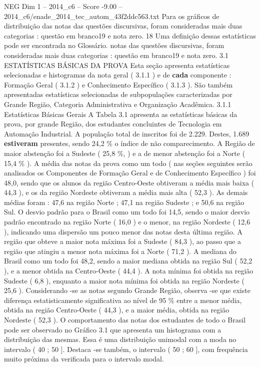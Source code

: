\begin{textsample}{NEG Dim 1 – 2014\_c6 – Score -9.00 – 2014\_c6/enade\_2014\_tec\_autom\_43f2ddc563.txt}
Para os gráficos de distribuição das notas das questões discursivas, foram consideradas mais duas categorias : questão em branco19 e nota zero. 18 Uma definição dessas estatísticas pode ser encontrada no Glossário. notas das questões discursivas, foram consideradas mais duas categorias : questão em branco19 e nota zero. 3.1 ESTATÍSTICAS BÁSICAS DA PROVA Esta seção apresenta estatísticas selecionadas e histogramas da nota geral ( 3.1.1 ) e de \textbf{cada} componente : Formação Geral ( 3.1.2 ) e Conhecimento Específico ( 3.1.3 ).
São também apresentadas estatísticas selecionadas de subpopulações caracterizadas por Grande Região, Categoria Administrativa e Organização Acadêmica. 3.1.1 Estatísticas Básicas Gerais A Tabela 3.1 apresenta as estatísticas básicas da prova, por grande Região, dos estudantes concluintes de Tecnologia em Automação Industrial.
A população total de inscritos foi de 2.229.
Destes, 1.689 \textbf{estiveram} presentes, sendo 24,2 \% o índice de não comparecimento.
A Região de maior abstenção foi a Sudeste ( 25,8 \%, ) e a de menor abstenção foi a Norte ( 15,4 \% ).
A média das notas da prova como um todo ( nas seções seguintes serão analisados os Componentes de Formação Geral e de Conhecimento Específico ) foi 48,0, sendo que os alunos da região Centro-Oeste obtiveram a média mais baixa ( 44,3 ), e os da região Nordeste obtiveram a média mais alta ( 52,3 ).
As demais médias foram : 47,6 na região Norte ; 47,1 na região Sudeste ; e 50,6 na região Sul.
O desvio padrão para o Brasil como um todo foi 14,5, sendo o maior desvio padrão encontrado na região Norte ( 16,0 ) e o menor, na região Nordeste ( 12,6 ), indicando uma dispersão um pouco menor das notas desta última região.
A região que obteve a maior nota máxima foi a Sudeste ( 84,3 ), ao passo que a região que atingiu a menor nota máxima foi a Norte ( 71,2 ).
A mediana do Brasil como um todo foi 48,2, sendo a maior mediana obtida na região Sul ( 52,2 ), e a menor obtida na Centro-Oeste ( 44,4 ).
A nota mínima foi obtida na região Sudeste ( 6,8 ), enquanto a maior nota mínima foi obtida na região Nordeste ( 25,6 ).
Considerando -se as notas segundo Grande Região, observa -se que existe diferença estatisticamente significativa ao nível de 95 \% entre a menor média, obtida na região Centro-Oeste ( 44,3 ), e a maior média, obtida na região Nordeste ( 52,3 ).
O comportamento das notas dos estudantes de todo o Brasil pode ser observado no Gráfico 3.1 que apresenta um histograma com a distribuição das mesmas.
Essa é uma distribuição unimodal com a moda no intervalo ( 40 ; 50 ].
Destaca -se também, o intervalo ( 50 ; 60 ], com frequência muito próxima da verificada para o intervalo modal.

\end{textsample}
